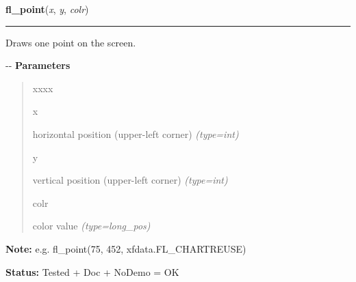     \label{xformslib:flxbasic:fl_point}

    \vspace{0.5ex}

\hspace{.8\funcindent}\begin{boxedminipage}{\funcwidth}

    \raggedright \textbf{fl\_point}(\textit{x}, \textit{y}, \textit{colr})

    \vspace{-1.5ex}

    \rule{\textwidth}{0.5\fboxrule}
\setlength{\parskip}{2ex}

Draws one point on the screen.

-{}-
\setlength{\parskip}{1ex}
      \textbf{Parameters}
      \vspace{-1ex}

      \begin{quote}
        \begin{Ventry}{xxxx}

          \item[x]


horizontal position (upper-left corner)
            {\it (type=int)}

          \item[y]


vertical position (upper-left corner)
            {\it (type=int)}

          \item[colr]


color value
            {\it (type=long\_pos)}

        \end{Ventry}

      \end{quote}

\textbf{Note:} 
e.g. fl\_point(75, 452, xfdata.FL\_CHARTREUSE)


\textbf{Status:} 
Tested + Doc + NoDemo = OK


    \end{boxedminipage}

    \label{xformslib:flxbasic:fl_points}

    \vspace{0.5ex}

